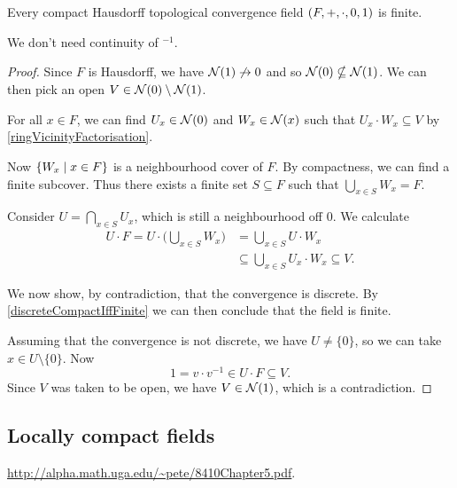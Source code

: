 \begin{proposition} \label{compactT2TopologicalFieldFinite}
Every compact Hausdorff topological convergence field $\sSet{F,+,\cdot, 0,1}$ is finite.
\end{proposition}
We don't need continuity of ${}^{-1}$.
\begin{proof}
Since $F$ is Hausdorff, we have $\operatorname{\mathcal{N}}(1)\not\to 0$ and so $\operatorname{\mathcal{N}}(0) \nsubseteq \operatorname{\mathcal{N}}(1)$. We can then pick an open $V\in \operatorname{\mathcal{N}}(0) \setminus \operatorname{\mathcal{N}}(1)$.

For all $x\in F$, we can find $U_x\in \operatorname{\mathcal{N}}(0)$ and $W_x\in \operatorname{\mathcal{N}}(x)$ such that $U_x\cdot W_x \subseteq V$ by \ref{ringVicinityFactorisation}.

Now $\setbuilder{W_x}{x\in F}$ is a neighbourhood cover of $F$. By compactness, we can find a finite subcover. Thus there exists a finite set $S\subseteq F$ such that $\bigcup_{x\in S}W_x = F$.

Consider $U = \bigcap_{x\in S}U_x$, which is still a neighbourhood off $0$. We calculate
\begin{align*}
U\cdot F = U\cdot \Big(\bigcup_{x\in S}W_x\Big) &= \bigcup_{x\in S} U\cdot W_x \\
&\subseteq \bigcup_{x\in S} U_x\cdot W_x \subseteq V.
\end{align*}

We now show, by contradiction, that the convergence is discrete. By \ref{discreteCompactIffFinite} we can then conclude that the field is finite.

Assuming that the convergence is not discrete, we have $U \neq \{0\}$, so we can take $x\in U\setminus\{0\}$. Now
\[ 1 = v\cdot v^{-1} \in U\cdot F \subseteq V. \]
Since $V$ was taken to be open, we have $V\in \operatorname{\mathcal{N}}(1)$, which is a contradiction.
\end{proof}

\subsection{Locally compact fields}

\url{http://alpha.math.uga.edu/~pete/8410Chapter5.pdf}.